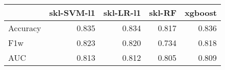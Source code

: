 \begin{tabular}{lrrrr}
\toprule
{} &  skl-SVM-l1 &  skl-LR-l1 &  skl-RF &  xgboost \\
\midrule
Accuracy &       0.835 &      0.834 &   0.817 &    0.836 \\
F1w      &       0.823 &      0.820 &   0.734 &    0.818 \\
AUC      &       0.813 &      0.812 &   0.805 &    0.809 \\
\bottomrule
\end{tabular}
